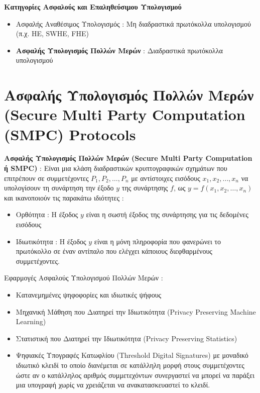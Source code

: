 \documentclass[10pt]{beamer}
\begin{document}
    \begin{frame}
        \textbf{Κατηγορίες Ασφαλούς και Επαληθεύσιμου Υπολογισμού}
        \begin{itemize}
            \item Ασφαλής Αναθέσιμος Υπολογισμός : Μη διαδραστικά πρωτόκολλα υπολογισμού (π.χ. HE, SWHE, FHE)
            \item \textbf{Ασφαλής Υπολογισμός Πολλών Μερών} : Διαδραστικά πρωτόκολλα υπολογισμού
        \end{itemize}
    \end{frame}

    \section{Ασφαλής Υπολογισμός Πολλών Μερών (Secure Multi Party Computation (SMPC) Protocols}
    \begin{frame}
        \begin{theorem}
            \textbf{Ασφαλής Υπολογισμός Πολλών Μερών (Secure Multi Party Computation ή SMPC)} : Είναι μια κλάση διαδραστικών κρυπτογραφικών σχημάτων που επιτρέπουν σε συμμετέχοντες $P_1, P_2, \dots, P_n$ με αντίστοιχες εισόδους $x_1, x_2, \dots, x_n$ να υπολογίσουν τη συνάρτηση την έξοδο $y$ της συνάρτησης $f$, ως $y = f(x_1, x_2, \dots, x_n)$ και ικανοποιούν τις παρακάτω ιδιότητες :
            \begin{itemize}
                \item Ορθότητα : Η έξοδος $y$ είναι η σωστή έξοδος της συνάρτησης για τις δεδομένες εισόδους
                \item Ιδιωτικότητα : Η έξοδος $y$ είναι η μόνη πληροφορία που φανερώνει το πρωτόκολλο σε έναν αντίπαλο που ελέγχει κάποιους διεφθαρμένους συμμετέχοντες.
            \end{itemize}
        \end{theorem}
    \end{frame}

    \begin{frame}
        Εφαρμογές Ασφαλούς Υπολογισμού Πολλών Μερών :
        \begin{itemize}
            \item Κατανεμημένες ψηφοφορίες και ιδιωτικές ψήφους
            \item Μηχανική Μάθηση που Διατηρεί την Ιδιωτικότητα (Privacy Preserving Machine Learning)
            \item Στατιστική που Διατηρεί την Ιδιωτικότητα (Privacy Preserving Statistics)
            \item Ψηφιακές Υπογραφές Κατωφλίου (Threshold Digital Signatures) με μοναδικό ιδιωτικό κλειδί το οποίο διανέμεται σε κατάλληλη μορφή στους συμμετέχοντες ώστε αν ο κατάλληλος αριθμός συμμετεχόντων συνεργαστεί να μπορεί να παράξει μια υπογραφή χωρίς να χρειάζεται να ανακατασκευαστεί το κλειδί.
        \end{itemize}
    \end{frame}
\end{document}
